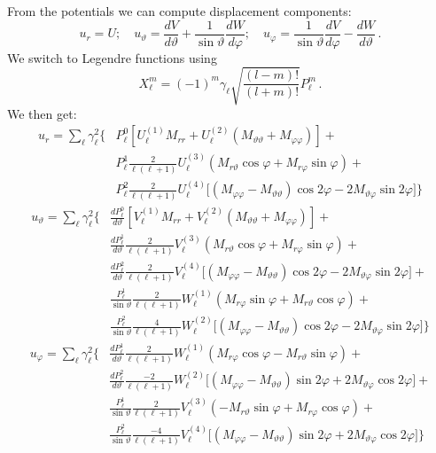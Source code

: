 \documentclass[12pt,a4paper]{article}
\begin{document}
From the potentials we can compute displacement components:
\begin{displaymath}
u_r = U;\quad u_\vartheta = \frac{dV}{d\vartheta}+\frac{1}{\sin\vartheta}\frac{dW}{d\varphi};\quad u_\varphi = \frac{1}{\sin\vartheta}\frac{dV}{d\varphi}-\frac{dW}{d\vartheta} \,.
\end{displaymath}
We switch to Legendre functions using 
\begin{displaymath}
X_\ell^m = (-1)^m \gamma_\ell\sqrt{\frac{(l-m)!}{(l+m)!}} P_\ell^m \,.
\end{displaymath}
We then get:
\begin{align}
u_r = \sum_\ell \gamma_\ell^2 \bigg\{ & P_\ell^0\left[U_\ell^{(1)}M_{rr}+U_\ell^{(2)}(M_{\vartheta\vartheta}+M_{\varphi\varphi})\right] + \nonumber \\
& P_\ell^1\frac{2}{\ell(\ell+1)}U_\ell^{(3)} \left(M_{r \vartheta}\cos\varphi+M_{r \varphi}\sin\varphi\right) + \nonumber \\
& P_\ell^2\frac{2}{\ell(\ell+1)}U_\ell^{(4)} \Big[(M_{\varphi\varphi}-M_{\vartheta\vartheta})\cos 2\varphi - 2M_{\vartheta\varphi}\sin 2\varphi\Big]\bigg\} \nonumber 
\end{align}
\begin{align}
u_\vartheta = \sum_\ell \gamma_\ell^2 \bigg\{ & \frac{dP_\ell^0}{d\vartheta}\left[V_\ell^{(1)}M_{rr}+V_\ell^{(2)}(M_{\vartheta\vartheta}+M_{\varphi\varphi})\right] + \nonumber \\
& \frac{dP_\ell^1}{d\vartheta}\frac{2}{\ell(\ell+1)}V_\ell^{(3)} \left(M_{r \vartheta}\cos\varphi+M_{r \varphi}\sin\varphi\right) + \nonumber \\
& \frac{dP_\ell^2}{d\vartheta}\frac{2}{\ell(\ell+1)}V_\ell^{(4)} \Big[(M_{\varphi\varphi}-M_{\vartheta\vartheta})\cos 2\varphi - 2M_{\vartheta\varphi}\sin 2\varphi\Big] + \nonumber  \\
& \frac{P_\ell^1}{\sin\vartheta}\frac{2}{\ell(\ell+1)}W_\ell^{(1)} \left(M_{r \varphi}\sin\varphi+M_{r \vartheta}\cos\varphi\right) + \nonumber  \\
& \frac{P_\ell^2}{\sin\vartheta}\frac{4}{\ell(\ell+1)}W_\ell^{(2)} \Big[(M_{\varphi\varphi}-M_{\vartheta\vartheta})\cos 2\varphi - 2M_{\vartheta\varphi}\sin 2\varphi\Big]\bigg\} \nonumber
\end{align}
\begin{align}
u_\varphi = \sum_\ell \gamma_\ell^2 \bigg\{ & \frac{dP_\ell^1}{d\vartheta}\frac{2}{\ell(\ell+1)}W_\ell^{(1)} \left(M_{r \varphi}\cos\varphi-M_{r \vartheta}\sin\varphi\right) + \nonumber \\
& \frac{dP_\ell^2}{d\vartheta}\frac{-2}{\ell(\ell+1)}W_\ell^{(2)} \Big[(M_{\varphi\varphi}-M_{\vartheta\vartheta})\sin 2\varphi + 2M_{\vartheta\varphi}\cos 2\varphi\Big] + \nonumber  \\
& \frac{P_\ell^1}{\sin\vartheta}\frac{2}{\ell(\ell+1)}V_\ell^{(3)} \left(-M_{r \vartheta}\sin\varphi+M_{r \varphi}\cos\varphi\right) + \nonumber  \\
& \frac{P_\ell^2}{\sin\vartheta}\frac{-4}{\ell(\ell+1)}V_\ell^{(4)} \Big[(M_{\varphi\varphi}-M_{\vartheta\vartheta})\sin 2\varphi + 2M_{\vartheta\varphi}\cos 2\varphi\Big]\bigg\} \nonumber
\end{align}
%
\end{document}
